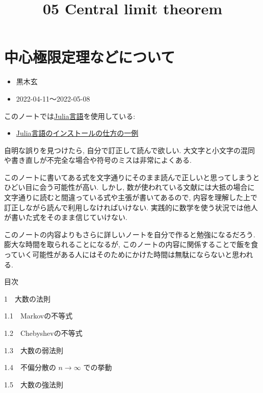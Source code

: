 \documentclass[10pt, a4paper,xelatex,ja=standard]{bxjsarticle}
\title{05 Central limit theorem}
\providecommand{\tightlist}{%
      \setlength{\itemsep}{0pt}\setlength{\parskip}{0pt}}
\begin{document}
    
    \maketitle
    
    

    
    \hypertarget{ux4e2dux5fc3ux6975ux9650ux5b9aux7406ux306aux3069ux306bux3064ux3044ux3066}{%
\section{中心極限定理などについて}\label{ux4e2dux5fc3ux6975ux9650ux5b9aux7406ux306aux3069ux306bux3064ux3044ux3066}}

\begin{itemize}
\tightlist
\item
  黒木玄
\item
  2022-04-11～2022-05-08
\end{itemize}

このノートでは\href{https://julialang.org/}{Julia言語}を使用している:

\begin{itemize}
\tightlist
\item
  \href{https://nbviewer.org/github/genkuroki/msfd28/blob/master/install.ipynb}{Julia言語のインストールの仕方の一例}
\end{itemize}

自明な誤りを見つけたら, 自分で訂正して読んで欲しい.
大文字と小文字の混同や書き直しが不完全な場合や符号のミスは非常によくある.

このノートに書いてある式を文字通りにそのまま読んで正しいと思ってしまうとひどい目に会う可能性が高い.
しかし,
数が使われている文献には大抵の場合に文字通りに読むと間違っている式や主張が書いてあるので,
内容を理解した上で訂正しながら読んで利用しなければいけない.
実践的に数学を使う状況では他人が書いた式をそのまま信じていけない.

このノートの内容よりもさらに詳しいノートを自分で作ると勉強になるだろう.
膨大な時間を取られることになるが,
このノートの内容に関係することで飯を食っていく可能性がある人にはそのためにかけた時間は無駄にならないと思われる.

    目次{}

{{1~~}大数の法則}

{{1.1~~}Markovの不等式}

{{1.2~~}Chebyshevの不等式}

{{1.3~~}大数の弱法則}

{{1.4~~}不偏分散の \(n\to\infty\) での挙動}

{{1.5~~}大数の強法則}
\end{document}
